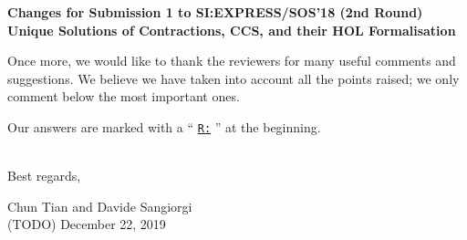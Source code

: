 \newcommand{\Mark}{{\underline{\tt R:} }}


\begin{center}
\textbf{
{\small Changes for Submission 1 to SI:EXPRESS/SOS'18 (2nd Round)}\\[5mm]
{\large Unique Solutions of Contractions, CCS, and their HOL
  Formalisation
}}
\end{center}



\vskip 10pt
\noindent

Once more, we would like to thank the reviewers for many useful
 comments and suggestions. %
We believe we have taken into account all 
the points raised; we only comment below the most
important ones.





Our answers are marked  with a `` \Mark''  at the beginning.

\ \\

Best regards,
\begin{flushright}
  Chun Tian and Davide Sangiorgi \\
  (TODO) December 22, 2019
\end{flushright}



